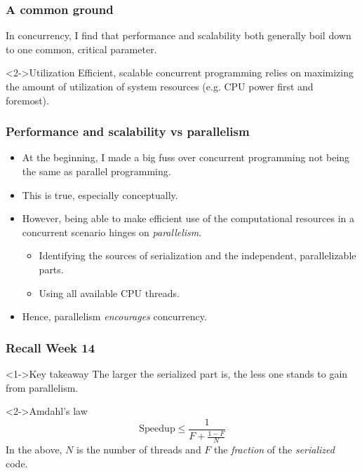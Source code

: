 \documentclass[xcolor={dvipsnames,svgnames},aspectratio=169]{beamer}
\begin{document}
\begin{frame}[fragile]
  \frametitle{A common ground}

  In concurrency, I find that performance and scalability both generally boil down to one
  common, critical parameter.

  \vspace{0.6cm}

  \begin{block}<2->{\faLightbulb \quad Utilization}
    Efficient, scalable concurrent programming relies on maximizing the amount
    of utilization of system resources (e.g. CPU power first and foremost).
  \end{block}
\end{frame}

\begin{frame}[fragile]
  \frametitle{Performance and scalability vs parallelism}
\begin{itemize}
\item[\faBook]<1-> At the beginning, I made a big fuss over concurrent
  programming  not being the same as parallel programming.
\item[\faBook]<2-> This is true, especially conceptually.
\item[\faBook]<3-> However, being able to make efficient use of the
  computational resources in a concurrent scenario hinges on
  \emph{parallelism}.
  \begin{itemize}
  \item[\faBook]<3-> Identifying the sources of serialization and the
    independent, parallelizable parts.
  \item[\faBook]<3-> Using all available CPU threads.
  \end{itemize}
\item[\faBook]<4-> Hence, parallelism \emph{encourages} concurrency.
\end{itemize}

\end{frame}

\begin{frame}[fragile]
  \frametitle{Recall Week 14}

  \begin{block}<1->{\faLightbulb \quad Key takeaway}
    The larger the serialized part is, the less one stands to gain from parallelism.
  \end{block}

  \vspace{0.6cm}

  \begin{block}<2->{\faLightbulb \quad Amdahl's law}
    \[
      \mathrm{Speedup} \leq \frac{1}{F + \frac{1-F}{N}}
    \]
    In the above, $N$ is the number of threads and $F$ the \emph{fraction} of
    the \emph{serialized} code.
  \end{block}
\end{frame}
\end{document}
